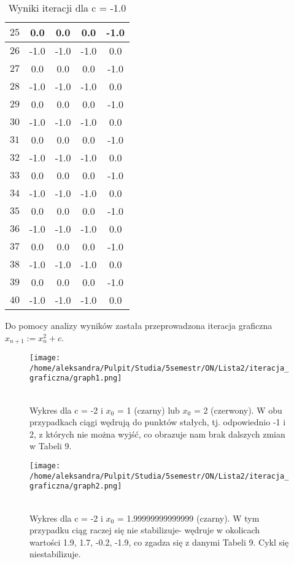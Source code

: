 \documentclass{article}
\begin{document}
\begin{table}[H]
\begin{tabular}{|c|c|c|c|c|}
\( 25 \) & 0.0 & 0.0 & 0.0 & -1.0  \\ \hline
\( 26 \) & -1.0 & -1.0 & -1.0 & 0.0  \\ \hline
\( 27 \) & 0.0 & 0.0 & 0.0 & -1.0  \\ \hline
\( 28 \) & -1.0 & -1.0 & -1.0 & 0.0  \\ \hline
\( 29 \) & 0.0 & 0.0 & 0.0 & -1.0  \\ \hline
\( 30 \) & -1.0 & -1.0 & -1.0 & 0.0  \\ \hline
\( 31 \) & 0.0 & 0.0 & 0.0 & -1.0  \\ \hline
\( 32 \) & -1.0 & -1.0 & -1.0 & 0.0  \\ \hline
\( 33 \) & 0.0 & 0.0 & 0.0 & -1.0  \\ \hline
\( 34 \) & -1.0 & -1.0 & -1.0 & 0.0  \\ \hline
\( 35 \) & 0.0 & 0.0 & 0.0 & -1.0  \\ \hline
\( 36 \) & -1.0 & -1.0 & -1.0 & 0.0  \\ \hline
\( 37 \) & 0.0 & 0.0 & 0.0 & -1.0  \\ \hline
\( 38 \) & -1.0 & -1.0 & -1.0 & 0.0  \\ \hline
\( 39 \) & 0.0 & 0.0 & 0.0 & -1.0  \\ \hline
\( 40 \) & -1.0 & -1.0 & -1.0 & 0.0  \\ \hline
\end{tabular}
\caption{Wyniki iteracji dla c = -1.0}
\end{table}

Do pomocy analizy wyników zastała przeprowadzona iteracja graficzna $x_{n+1} := x_n^2 + c$. 
\begin{figure}[H]
    \centering
    \begin{minipage}{0.43\textwidth}
        \centering
        \texttt{[image: /home/aleksandra/Pulpit/Studia/5semestr/ON/Lista2/iteracja\_graficzna/graph1.png]}
        \caption{\\Wykres dla c = -2 i $x_0$ = 1 (czarny) lub $x_0$ = 2 (czerwony). W obu przypadkach ciągi wędrują do punktów stałych, tj. odpowiednio -1 i 2, z których nie można wyjść, co obrazuje nam brak dalszych zmian w Tabeli 9.}
    \end{minipage}
    \hfill
    \begin{minipage}{0.48\textwidth}
        \centering
        \texttt{[image: /home/aleksandra/Pulpit/Studia/5semestr/ON/Lista2/iteracja\_graficzna/graph2.png]}
        \caption{\\ Wykres dla c = -2 i $x_0$ = 1.99999999999999 (czarny). W tym przypadku ciąg raczej się nie stabilizuje- wędruje w okolicach wartości 1.9, 1.7, -0.2, -1.9, co zgadza się z danymi Tabeli 9. Cykl się niestabilizuje.}
    \end{minipage}
\end{figure}
\end{document}
